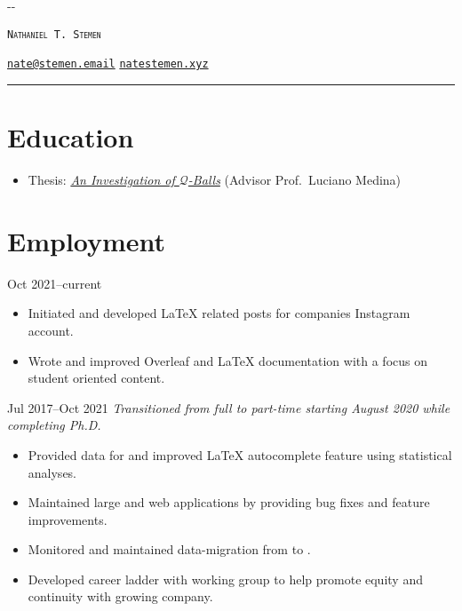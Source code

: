 \documentclass{cultvoucher}
\begin{document}
\thispagestyle{firststyle}

\begin{adjustwidth}{\dimexpr-\marginparsep-\marginparwidth}{}
	\begin{center}
		{\HUGE \textsc{\texttt{Nathaniel T. Stemen}}\par}
		\href{mailto:nate@stemen.email}{\texttt{nate@stemen.email}} \textbullet{}
		\href{https://natestemen.xyz}{\texttt{natestemen.xyz}}
		\rule{\dimexpr\textwidth+\marginparsep+\marginparwidth}{0.4pt}\par
	\end{center}
\end{adjustwidth}

\section{Education}

\begin{itemize}
	\vspace{-0.25em}
	\item Thesis: \href{https://natestemen.xyz/qv-thesis.pdf}{\textit{An Investigation of $\mathcal{Q}$-Balls}} (Advisor Prof.\ Luciano Medina)
\end{itemize}

\section{Employment}
{Oct 2021--current}
\begin{itemize}
	\vspace{-0.25em}
	\item Initiated and developed \LaTeX{} related posts for companies Instagram account.
	\item Wrote and improved Overleaf and \LaTeX{} documentation with a focus on student oriented content.
\end{itemize}
{Jul 2017--Oct 2021}
\vspace{-0.25em}
\emph{Transitioned from full to part-time starting August 2020 while completing Ph.D.}
\begin{itemize}
	\vspace{-0.25em}
	\item Provided data for and improved \LaTeX{} autocomplete feature using statistical analyses.
	\item Maintained large  and  web applications by providing bug fixes and feature improvements.
	\item Monitored and maintained data-migration from  to .
	\item Developed career ladder with working group to help promote equity and continuity with growing company.
\end{itemize}
\end{document}
